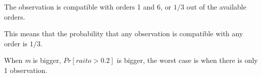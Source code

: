\documentclass[11pt, a4paper]{article}
\begin{document}
\noindent The observation is compatible with orders 1 and 6, or 
$1/3$ out of the available orders. 

\noindent This means that the probability that any observation is
compatible with any order is $1/3$.

\noindent When \textit{m} is bigger, $Pr[raito > 0.2]$ is bigger,
the worst case is when there is only 1 observation.
\end{document}
